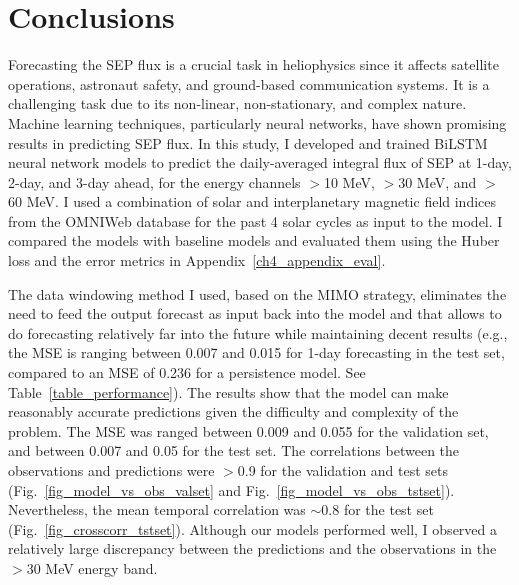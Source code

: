 \section{Conclusions}
Forecasting the SEP flux is a crucial task in heliophysics since it affects satellite operations, astronaut safety, and ground-based communication systems. It is a challenging task due to its non-linear, non-stationary, and complex nature. Machine learning techniques, particularly neural networks, have shown promising results in predicting SEP flux.
In this study, I developed and trained BiLSTM neural network models to predict the daily-averaged integral flux of SEP at 1-day, 2-day, and 3-day ahead, for the energy channels $>$10 MeV, $>$30 MeV, and $>$60 MeV.
I used a combination of solar and interplanetary magnetic field indices from the OMNIWeb database for the past 4 solar cycles as input to the model.
I compared the models with baseline models and evaluated them using the Huber loss and the error metrics in Appendix~\ref{ch4_appendix_eval}.

The data windowing method I used, based on the MIMO strategy, eliminates the need to feed the output forecast as input back into the model and that allows to do forecasting relatively far into the future while maintaining decent results (e.g., the MSE is ranging between 0.007 and 0.015 for 1-day forecasting in the test set, compared to an MSE of 0.236 for a persistence model. See Table~\ref{table_performance}).
The results show that the model can make reasonably accurate predictions given the difficulty and complexity of the problem.
The MSE was ranged between 0.009 and 0.055 for the validation set, and between 0.007 and 0.05 for the test set.
The correlations between the observations and predictions were $>$0.9 for the validation and test sets (Fig.~\ref{fig_model_vs_obs_valset} and Fig.~\ref{fig_model_vs_obs_tstset}).
Nevertheless, the mean temporal correlation was $\sim$0.8 for the test set (Fig.~\ref{fig_crosscorr_tstset}).
Although our models performed well, I observed a relatively large discrepancy between the predictions and the observations in the $>$30 MeV energy band.

